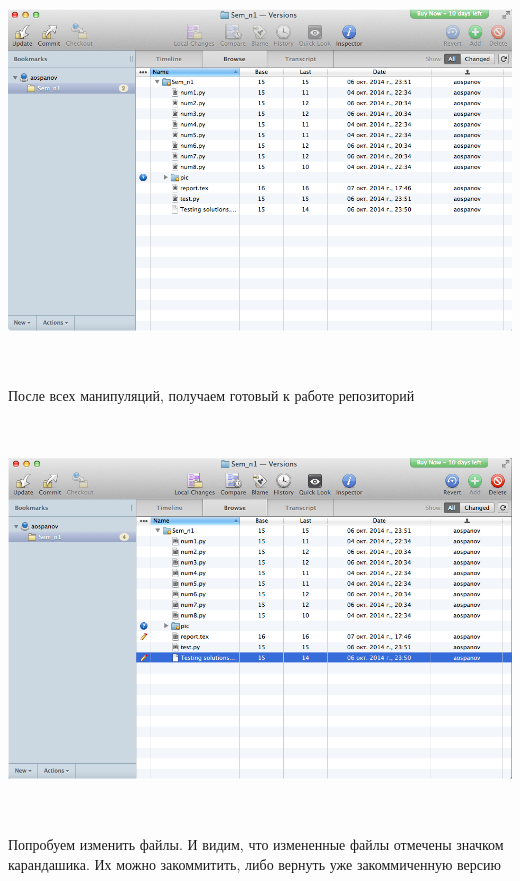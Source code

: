 \documentclass[12pt, a4paper]{article}
\begin{document}
			\begin{center}
				\includegraphics[height=10.5cm]{svn/svn_10.png}

				После всех манипуляций, получаем готовый к работе репозиторий \\
			\end{center}

			\begin{center}
				\includegraphics[height=10.5cm]{svn/svn_11.png}

				Попробуем изменить файлы. И видим, что измененные файлы отмечены значком карандашика. Их можно закоммитить, либо вернуть уже закоммиченную версию \\
				~\newline
			\end{center}
\end{document}
